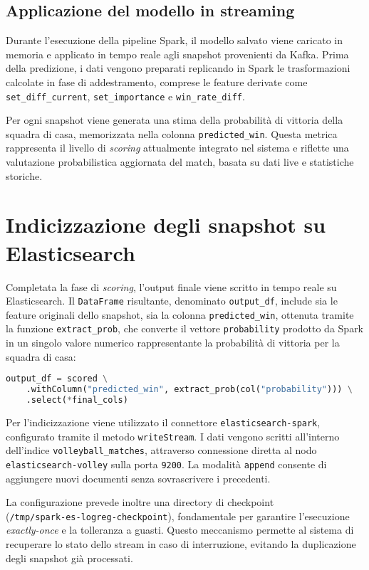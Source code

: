 \documentclass[a4paper,12pt]{report}
\begin{document}
\subsection{Applicazione del modello in streaming}

Durante l’esecuzione della pipeline Spark, il modello salvato viene caricato in memoria e applicato in tempo reale agli snapshot provenienti da Kafka. Prima della predizione, i dati vengono preparati replicando in Spark le trasformazioni calcolate in fase di addestramento, comprese le feature derivate come \texttt{set\_diff\_current}, \texttt{set\_importance} e \texttt{win\_rate\_diff}.

Per ogni snapshot viene generata una stima della probabilità di vittoria della squadra di casa, memorizzata nella colonna \texttt{predicted\_win}. Questa metrica rappresenta il livello di \textit{scoring} attualmente integrato nel sistema e riflette una valutazione probabilistica aggiornata del match, basata su dati live e statistiche storiche.


\section{Indicizzazione degli snapshot su Elasticsearch}

Completata la fase di \textit{scoring}, l’output finale viene scritto in tempo reale su Elasticsearch. Il \texttt{DataFrame} risultante, denominato \texttt{output\_df}, include sia le feature originali dello snapshot, sia la colonna \texttt{predicted\_win}, ottenuta tramite la funzione \texttt{extract\_prob}, che converte il vettore \texttt{probability} prodotto da Spark in un singolo valore numerico rappresentante la probabilità di vittoria per la squadra di casa:

\begin{lstlisting}[language=Python]
output_df = scored \
    .withColumn("predicted_win", extract_prob(col("probability"))) \
    .select(*final_cols)
\end{lstlisting}

Per l’indicizzazione viene utilizzato il connettore \texttt{elasticsearch-spark}, configurato tramite il metodo \texttt{writeStream}. I dati vengono scritti all’interno dell’indice \texttt{volleyball\_matches}, attraverso connessione diretta al nodo \texttt{elasticsearch-volley} sulla porta \texttt{9200}. La modalità \texttt{append} consente di aggiungere nuovi documenti senza sovrascrivere i precedenti.

La configurazione prevede inoltre una directory di checkpoint \\ (\texttt{/tmp/spark-es-logreg-checkpoint}), fondamentale per garantire l’esecuzione \textit{exactly-once} e la tolleranza a guasti. Questo meccanismo permette al sistema di recuperare lo stato dello stream in caso di interruzione, evitando la duplicazione degli snapshot già processati.
\end{document}
